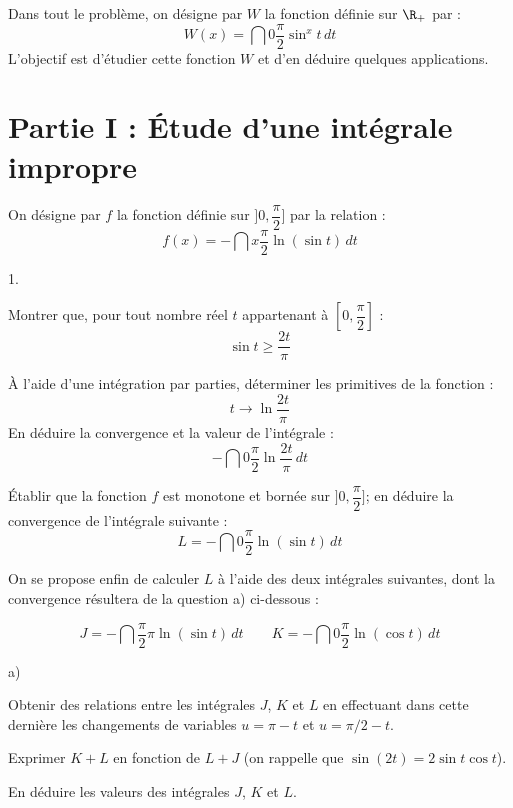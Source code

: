 \documentclass[11pt]{article}%
\begin{document}
Dans tout le problème, on désigne par $W$ la fonction définie sur
$\R_{+}$ par : 
\[
W(x) = \dint{0}{\dfrac{\pi }{2}}\sin ^{x}t\,dt
\]
L'objectif est d'étudier cette fonction $W$ et d'en déduire quelques
applications.

\section*{Partie I : Étude d'une intégrale impropre}

{\normalsize On désigne par $f$ la fonction définie sur $]0,\dfrac{\pi
}{2}]$
par la relation : 
\[
f(x) = -\dint{x}{\dfrac{\pi }{2}}\ln (\sin t)\,dt
\]
}

\begin{noliste}{1.}
 \setlength{\itemsep}{4mm}
\item Montrer que, pour tout nombre réel $t$ appartenant à
$[0,\dfrac{\pi }{2}]$ :
\[
\sin t\geq \dfrac{2t}{\pi }
\]

\item À l'aide d'une intégration par parties, déterminer les primitives
de
la fonction : 
\[
t\rightarrow \ln \dfrac{2t}{\pi }
\]
En déduire la convergence et la valeur de l'intégrale : 
\[
-\dint{0}{\dfrac{\pi }{2}}\ln \dfrac{2t}{\pi }\,dt
\]

\item Établir que la fonction $f$ est monotone et bornée sur
$]0,\dfrac{\pi 
}{2}]$; en déduire la convergence de l'intégrale suivante : 
\[
L = -\dint{0}{\dfrac{\pi }{2}}\ln (\sin t)\,dt
\]

\item On se propose enfin de calculer $L$ à l'aide des deux intégrales
suivantes, dont la convergence résultera de la question a) ci-dessous :

\[
J = -\dint{\dfrac{\pi }{2}}{\pi }\ln (\sin t)\,dt\qquad
K = -\dint{0}{\dfrac{\pi }{2}}\ln (\cos t)\,dt
\]

\begin{noliste}{a)}
 \setlength{\itemsep}{2mm}
\item Obtenir des relations entre les intégrales $J$, $K$ et $L$ en
effectuant dans cette dernière les changements de variables $u = \pi
-t$ et $u = \pi /2-t$.

\item Exprimer $K + L$ en fonction de $L + J$ (on rappelle que $\sin
(2t) = 2\sin
t\cos t$).

\item En déduire les valeurs des intégrales $J$, $K$ et $L$.
\end{noliste}
\end{noliste}
\end{document}
